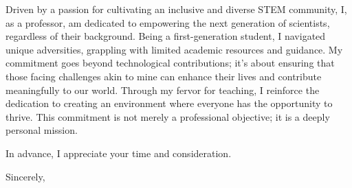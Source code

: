 \documentclass[12pt]{article}
\begin{document}
Driven by a passion for cultivating an inclusive and diverse STEM community, I, as a professor, am dedicated to empowering the next generation of scientists, regardless of their background. Being a first-generation student, I navigated unique adversities, grappling with limited academic resources and guidance. My commitment goes beyond technological contributions; it's about ensuring that those facing challenges akin to mine can enhance their lives and contribute meaningfully to our world. Through my fervor for teaching, I reinforce the dedication to creating an environment where everyone has the opportunity to thrive. This commitment is not merely a professional objective; it is a deeply personal mission.


In advance, I appreciate your time and consideration. 

Sincerely,
\end{document}
